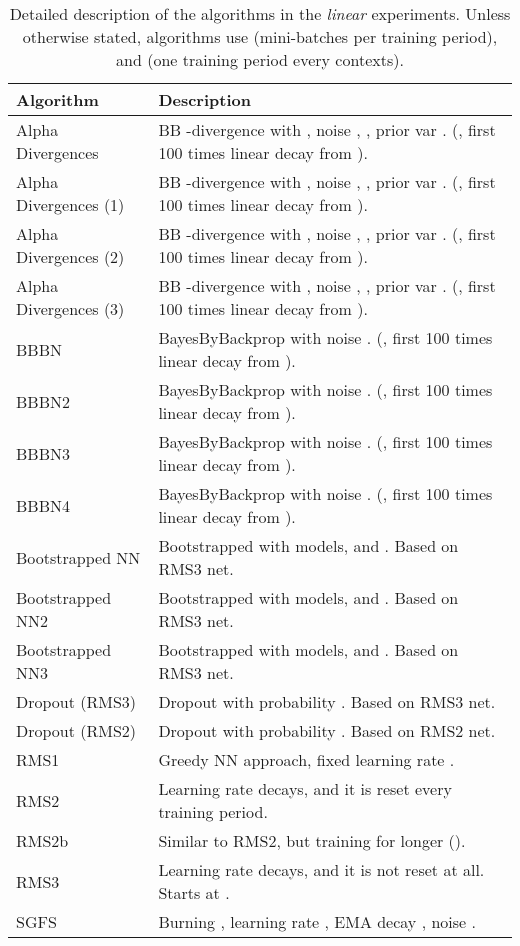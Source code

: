 \documentclass{article} \usepackage{iclr2018_conference,times}
\begin{document}
\begin{table}[ht]
  \caption{Detailed description of the algorithms in the \emph{linear} experiments. Unless otherwise stated, algorithms use  (mini-batches per training period), and  (one training period every  contexts).}
  \label{tab:algo_linear_description}
  \centering
  \footnotesize
  \tiny
  \begin{tabular}{ll}
  Algorithm  & Description \\
    \midrule
Alpha Divergences & BB -divergence with , noise , , prior var . (, first 100 times linear decay from ). \\
Alpha Divergences (1) & BB -divergence with , noise , , prior var . (, first 100 times linear decay from ).  \\
Alpha Divergences (2) & BB -divergence with , noise , , prior var . (, first 100 times linear decay from ).  \\
Alpha Divergences (3) & BB -divergence with , noise , , prior var . (, first 100 times linear decay from ).  \\
BBBN & BayesByBackprop with noise . (, first 100 times linear decay from ). \\
BBBN2 & BayesByBackprop with noise . (, first 100 times linear decay from ). \\
BBBN3 & BayesByBackprop with noise . (, first 100 times linear decay from ). \\
BBBN4 & BayesByBackprop with noise . (, first 100 times linear decay from ). \\
Bootstrapped NN & Bootstrapped with  models, and . Based on RMS3 net. \\
Bootstrapped NN2 & Bootstrapped with  models, and . Based on RMS3 net. \\
Bootstrapped NN3 & Bootstrapped with  models, and . Based on RMS3 net. \\
Dropout (RMS3) & Dropout with probability . Based on RMS3 net. \\
Dropout (RMS2) & Dropout with probability . Based on RMS2 net. \\
RMS1 & Greedy NN approach, fixed learning rate . \\
RMS2 & Learning rate decays, and it is reset every training period. \\
RMS2b & Similar to RMS2, but training for longer (). \\
RMS3 & Learning rate decays, and it is not reset at all. Starts at . \\
SGFS & Burning , learning rate , EMA decay , noise . \\

\end{tabular}
\end{table}
\end{document}
